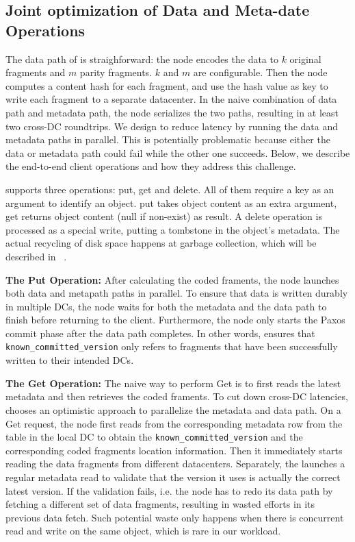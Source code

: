 \subsection{Joint optimization of Data and Meta-date Operations}

The data path of \name is straighforward: the \name node encodes the data to $k$ original
fragments and $m$ parity fragments. $k$ and $m$ are configurable. Then the node
computes a content hash for each fragment, and use the hash value as key to
write each fragment to a separate datacenter.  In the naive combination of data
path and metadata path, the \name node serializes the two paths,
resulting in at least two cross-DC roundtrips.  We design \name to reduce
latency by running the data and metadata paths in parallel.  This is
potentially problematic because either the data or metadata path could fail
while the other one succeeds.  Below, we describe the end-to-end client
operations and how they address this challenge.

{\name} supports three operations: put, get and delete. All of them require a key as
an argument to identify an object. put takes object content as an extra argument, get
returns object content (null if non-exist) as result. A delete operation is processed
as a special write, putting a tombstone in the object's metadata. The actual recycling
of disk space happens at garbage collection, which will be described in ~.

{\bf The Put Operation:}
After calculating the coded framents, the \name node launches both data and
metapath paths in parallel.  To ensure that data is written durably in multiple
DCs, the \name node waits for both the metadata and the data path to finish
before returning to the client.  Furthermore, the \name node only starts 
the Paxos commit phase after the data path completes. In other words, \name 
ensures that {\tt known\_committed\_version} only refers to fragments
that have been successfully written to their intended DCs.
 
{\bf The Get Operation:}
The naive way to perform Get is to first reads the latest metadata and then retrieves 
the coded framents. 
To cut down cross-DC latencies, {\name} chooses an optimistic approach to parallelize the metadata and data path.
On a Get request, the {\name} node first reads from the corresponding metadata row from the table in the local DC
to obtain the {\tt known\_committed\_version} and the corresponding coded 
fragments location information. Then it immediately starts reading the data fragments from different
datacenters.  Separately, the {\name} launches a regular metadata read to validate that the version it uses is actually
the correct latest version. If the validation fails, i.e. the \name node
has to redo its data path by fetching a different set of data fragments,
resulting in wasted efforts in its previous data fetch.  Such potential waste
only happens when there is concurrent read and write on the same object, which
is rare in our workload.

